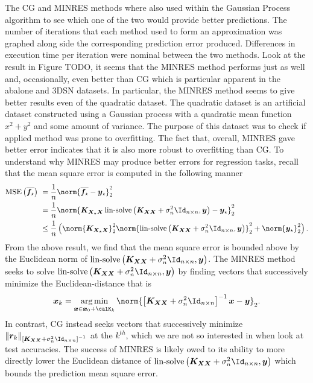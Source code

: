 The CG and MINRES methods where also used within the Gaussian Process algorithm to see which one of the two would provide better predictions. The number of iterations that each method used to form an approximation was graphed along side the corresponding prediction error produced. Differences in execution time per iteration were nominal between the two methods. Look at the result in Figure TODO, it seems that the MINRES method performs just as well and, occasionally, even better than CG which is particular apparent in the abalone and 3DSN datasets. In particular, the MINRES method seems to give better results even of the quadratic dataset. The quadratic dataset is an artificial dataset constructed using a Gaussian process with a quadratic mean function $x^2 + y^2$ and some amount of variance. The purpose of this dataset was to check if applied method was prone to overfitting. The fact that, overall, MINRES gave better error indicates that it is also more robust to overfitting than CG. To understand why MINRES may produce better errors for regression tasks, recall that the mean square error is computed in the following manner
\begin{align*}
    \operatorname{MSE} \left( \overline{\bm{f}_{\star}} \right) \
     & = \frac{1}{n} \norm{\overline{\bm{f}_{\star}} - \bm{y}_{\star}}_2^2                                                                                                                                \\
     & = \frac{1}{n} \norm{\bm{K_{X_{\star} X}} \operatorname{lin-solve} \left( \bm{K_{XX}} + \sigma_n^2 \Id_{n \times n} , \bm{y} \right) - \bm{y}_{\star}}_2^2                                          \\
     & \leq \frac{1}{n} \left( \norm{\bm{K_{X_{\star} X}}}_2^2 \norm{\operatorname{lin-solve} \left( \bm{K_{XX}} + \sigma_n^2 \Id_{n \times n} , \bm{y} \right)}_2^2 + \norm{\bm{y}_{\star}}_2^2 \right).
\end{align*}
From the above result, we find that the mean square error is bounded above by the Euclidean norm of $\operatorname{lin-solve} \left( \bm{K_{XX}} + \sigma_n^2 \Id_{n \times n} , \bm{y} \right)$. The MINRES method seeks to solve $\operatorname{lin-solve} \left( \bm{K_{XX}} + \sigma_n^2 \Id_{n \times n} , \bm{y} \right)$ by finding vectors that successively minimize the Euclidean-distance that is
\begin{equation*}
    \bm{x}_k = \argmin_{\bm{x} \in \bm{x}_0 + \calK_k} \norm{\left[ \bm{K_{XX}} + \sigma_n^2 \Id_{n \times n} \right]^{-1} \bm {x} - \bm{y}}_2.
\end{equation*}
In contrast, CG instead seeks vectors that successively minimize $\| \bm{r}_{k} \|_{\left[ \bm{K_{XX}} + \sigma_n^2 \Id_{n \times n} \right]^{-1}}$ at the $k^{th}$, which we are not so interested in when look at test accuracies. The success of MINRES is likely owed to its ability to more directly lower the Euclidean distance of $\operatorname{lin-solve} \left( \bm{K_{XX}} + \sigma_n^2 \Id_{n \times n} , \bm{y} \right)$ which bounds the prediction mean square error.